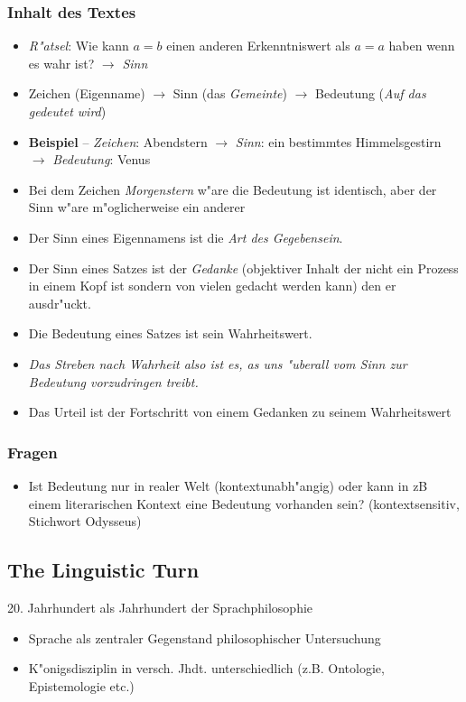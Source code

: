 \documentclass[]{scrartcl}
\begin{document}
\subsubsection{Inhalt des Textes}
\begin{itemize}
  \item \emph{R"atsel}: Wie kann $a = b$ einen anderen Erkenntniswert als $ a = a$ haben wenn es wahr ist? $\rightarrow$ \emph{Sinn} 
  \item Zeichen (Eigenname) $\rightarrow$ Sinn (das \emph{Gemeinte}) $\rightarrow$ Bedeutung (\emph{Auf das gedeutet wird})
  \item \textbf{Beispiel} -- \emph{Zeichen}: Abendstern $\rightarrow$ \emph{Sinn}: ein bestimmtes Himmelsgestirn $\rightarrow$ \emph{Bedeutung}: Venus 
  \item Bei dem Zeichen \emph{Morgenstern} w"are die Bedeutung ist identisch, aber der Sinn w"are m"oglicherweise ein anderer
  \item Der Sinn eines Eigennamens ist die \emph{Art des Gegebensein}.
  \item Der Sinn eines Satzes ist der \emph{Gedanke} (objektiver Inhalt der nicht ein Prozess in einem Kopf ist sondern von vielen gedacht werden kann) den er ausdr"uckt.
  \item Die Bedeutung eines Satzes ist sein Wahrheitswert.
  \item \emph{Das Streben nach Wahrheit also ist es, as uns "uberall vom Sinn zur Bedeutung vorzudringen treibt.}
  \item Das Urteil ist der Fortschritt von einem Gedanken zu seinem Wahrheitswert
\end{itemize}
\subsubsection{Fragen}
\begin{itemize}
  \item Ist Bedeutung nur in realer Welt (kontextunabh"angig) oder kann in zB einem literarischen Kontext eine Bedeutung vorhanden sein? (kontextsensitiv, Stichwort Odysseus)
\end{itemize}

\subsection{The Linguistic Turn }

20. Jahrhundert als Jahrhundert der Sprachphilosophie
\begin{itemize}
  \item Sprache als zentraler Gegenstand philosophischer Untersuchung
  \item K"onigsdisziplin in versch. Jhdt. unterschiedlich (z.B. Ontologie, Epistemologie etc.)
\end{itemize}
\end{document}
